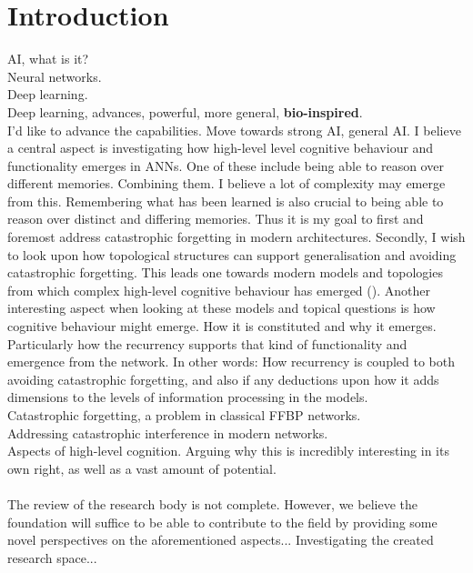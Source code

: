 
\chapter{Introduction}

AI, what is it?
\\
Neural networks.
\\
Deep learning.
\\
Deep learning, advances, powerful, more general, \textbf{bio-inspired}.
\\
I'd like to advance the capabilities. Move towards strong AI, general AI.
I believe a central aspect is investigating how high-level level cognitive behaviour and functionality emerges in ANNs.
One of these include being able to reason over different memories. Combining them. I believe a lot of complexity may emerge from this.
Remembering what has been learned is also crucial to being able to reason over distinct and differing memories.
Thus it is my goal to first and foremost address catastrophic forgetting in modern architectures.
Secondly, I wish to look upon how topological structures can support generalisation and avoiding catastrophic forgetting.
This leads one towards modern models and topologies from which complex high-level cognitive behaviour has emerged (\cite{Tani2014}).
Another interesting aspect when looking at these models and topical questions is how cognitive behaviour might emerge. How it is constituted and why it emerges. Particularly how the recurrency supports that kind of functionality and emergence from the network. In other words: How recurrency is coupled to both avoiding catastrophic forgetting, and also if any deductions upon how it adds dimensions to the levels of information processing in the models.
\\
Catastrophic forgetting, a problem in classical FFBP networks.
\\
Addressing catastrophic interference in modern networks.
\\
Aspects of high-level cognition. Arguing why this is incredibly interesting in its own right, as well as a vast amount of potential.
\\\\
The review of the research body is not complete. However, we believe the foundation will suffice to be able to contribute to the field by providing some novel perspectives on the aforementioned aspects... Investigating the created research space...

\cleardoublepage